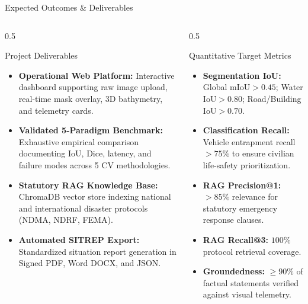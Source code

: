 \documentclass[aspectratio=169, 10pt, professionalfonts]{beamer}
\begin{document}
\begin{frame}{Expected Outcomes \& Deliverables}
  \begin{columns}[T]
    \begin{column}{0.5\textwidth}
      \begin{block}{Project Deliverables}
        \begin{itemize}\setlength{\itemsep}{0.5em}\footnotesize
          \item \textbf{Operational Web Platform:} Interactive dashboard supporting raw image upload, real-time mask overlay, 3D bathymetry, and telemetry cards.
          \item \textbf{Validated 5-Paradigm Benchmark:} Exhaustive empirical comparison documenting IoU, Dice, latency, and failure modes across 5 CV methodologies.
          \item \textbf{Statutory RAG Knowledge Base:} ChromaDB vector store indexing national and international disaster protocols (NDMA, NDRF, FEMA).
          \item \textbf{Automated SITREP Export:} Standardized situation report generation in Signed PDF, Word DOCX, and JSON.
        \end{itemize}
      \end{block}
    \end{column}
    
    \begin{column}{0.5\textwidth}
      \begin{block}{Quantitative Target Metrics}
        \begin{itemize}\setlength{\itemsep}{0.5em}\footnotesize
          \item \textbf{Segmentation IoU:} Global $\text{mIoU} > 0.45$; Water $\text{IoU} > 0.80$; Road/Building $\text{IoU} > 0.70$.
          \item \textbf{Classification Recall:} Vehicle entrapment recall $> 75\%$ to ensure civilian life-safety prioritization.
          \item \textbf{RAG Precision@1:} $> 85\%$ relevance for statutory emergency response clauses.
          \item \textbf{RAG Recall@3:} $100\%$ protocol retrieval coverage.
          \item \textbf{Groundedness:} $\ge 90\%$ of factual statements verified against visual telemetry.
        \end{itemize}
      \end{block}
    \end{column}
  \end{columns}
\end{frame}
\end{document}

